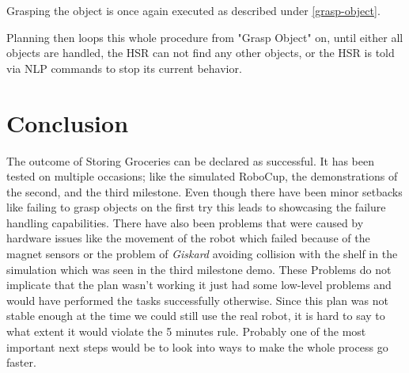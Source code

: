 \documentclass[main.tex]{subfiles}
\begin{document}
	\begin{manipulation}
	Grasping the object is once again executed as described under \ref{grasp-object}.
	\end{manipulation}
	
	\begin{planning}
	Planning then loops this whole procedure from "Grasp Object" on, until either all objects are handled, the HSR can not find any other objects, or the HSR is told via NLP commands to stop its current behavior.
	\end{planning}	
	
	\section{Conclusion}

	The outcome of Storing Groceries can be declared as successful. It has been tested on multiple occasions; like the simulated RoboCup, the demonstrations of the second, and the third milestone. 
	Even though there have been minor setbacks like failing to grasp objects on the first try this leads to showcasing the failure handling capabilities.
	There have also been problems that were caused by hardware issues like the movement of the robot which failed because of the magnet sensors or the problem of \textit{Giskard} avoiding collision with the shelf in the simulation which was seen in the third milestone demo.
	These Problems do not implicate that the plan wasn't working it just had some low-level problems and would have performed the tasks successfully otherwise.
	Since this plan was not stable enough at the time we could still use the real robot, it is hard to say to what extent it would violate the 5 minutes rule. Probably one of the most important next steps would be to look into ways to make the whole process go faster.
	
	\endgroup
	
\end{document}
